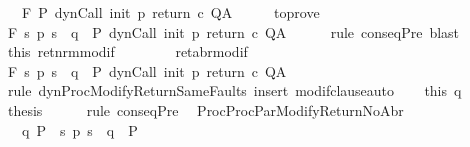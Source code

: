 \begin{isabellebody}
\ \ \ {\isachardoublequoteopen}{\isasymGamma}{\isacharcomma}{\isasymTheta}{\isasymturnstile}\isactrlbsub {\isacharslash}F\isactrlesub \ P\ {\isacharparenleft}dynCall\ init\ p\ return\ c{\isacharparenright}\ Q{\isacharcomma}A{\isachardoublequoteclose}\isanewline
%
\isadelimproof
%
\endisadelimproof
%
\isatagproof
{}\isamarkupfalse%
\ {\isacharminus}\isanewline
\ \ \isamarkupfalse%
\ to{\isacharunderscore}prove\ \isanewline
\ \ \isamarkupfalse%
\ {\isachardoublequoteopen}{\isasymGamma}{\isacharcomma}{\isasymTheta}{\isasymturnstile}\isactrlbsub {\isacharslash}F\isactrlesub \ {\isacharparenleft}{\isacharbraceleft}s{\isachardot}\ p\ s\ {\isacharequal}\ q{\isacharbraceright}\ {\isasyminter}\ P{\isacharprime}{\isacharparenright}\ {\isacharparenleft}dynCall\ init\ p\ return{\isacharprime}\ c{\isacharparenright}\ Q{\isacharcomma}A{\isachardoublequoteclose}\isanewline
\ \ \ \ \isamarkupfalse%
\ {\isacharparenleft}rule\ conseqPre{\isacharparenright}\ blast\isanewline
\ \ \isamarkupfalse%
\ this\ ret{\isacharunderscore}nrm{\isacharunderscore}modif\ \isanewline
\ \ \ \ \ \ \ ret{\isacharunderscore}abr{\isacharunderscore}modif\ \isanewline
\ \ \isamarkupfalse%
\ {\isachardoublequoteopen}{\isasymGamma}{\isacharcomma}{\isasymTheta}{\isasymturnstile}\isactrlbsub {\isacharslash}F\isactrlesub \ {\isacharparenleft}{\isacharbraceleft}s{\isachardot}\ p\ s\ {\isacharequal}\ q{\isacharbraceright}\ {\isasyminter}\ P{\isacharprime}{\isacharparenright}\ {\isacharparenleft}dynCall\ init\ p\ return\ c{\isacharparenright}\ Q{\isacharcomma}A{\isachardoublequoteclose}\isanewline
\ \ \ \ \isamarkupfalse%
\ {\isacharparenleft}rule\ dynProcModifyReturnSameFaults{\isacharparenright}\ {\isacharparenleft}insert\ modif{\isacharunderscore}clause{\isacharcomma}auto{\isacharparenright}\isanewline
\ \ \isamarkupfalse%
\ this\ q\ \isamarkupfalse%
\ {\isacharquery}thesis\isanewline
\ \ \ \ \isamarkupfalse%
\ {\isacharparenleft}rule\ conseqPre{\isacharparenright}\ \isanewline
{}\isamarkupfalse%
%
\endisatagproof
{\isafoldproof}%
%
\isadelimproof
\isanewline
%
\endisadelimproof
\isanewline
\isanewline
{}\isamarkupfalse%
\ ProcProcParModifyReturnNoAbr{\isacharcolon}\ \isanewline
\ \ \ q{\isacharcolon}\ {\isachardoublequoteopen}P\ {\isasymsubseteq}\ {\isacharbraceleft}s{\isachardot}\ p\ s\ {\isacharequal}\ q{\isacharbraceright}\ {\isasyminter}\ P{\isacharprime}{\isachardoublequoteclose}\isanewline

\end{isabellebody}
